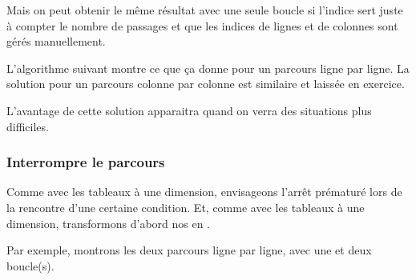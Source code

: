 

Mais on peut obtenir le même résultat avec une seule boucle
si l'indice sert juste à compter le nombre de passages
et que les indices de lignes et de colonnes sont gérés manuellement.

L'algorithme suivant montre ce que ça donne
pour un parcours ligne par ligne.
La solution pour un parcours colonne par colonne est similaire
et laissée en exercice.


L'avantage de cette solution apparaitra 
quand on verra des situations plus difficiles.

\subsubsection*{Interrompre le parcours}

Comme avec les tableaux à une dimension, 
envisageons l'arrêt prématuré lors de la rencontre d'une certaine condition.
Et, comme avec les tableaux à une dimension, 
transformons d'abord nos  en .

Par exemple, montrons les deux parcours ligne par ligne, avec une et deux boucle(s).


